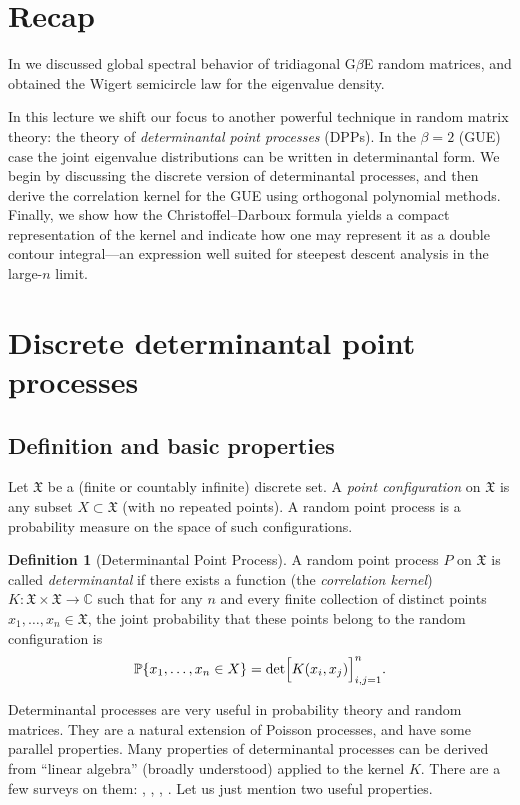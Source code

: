 \documentclass[letterpaper,11pt,oneside,reqno]{book}
\numberwithin{equation}{chapter}  %
\theoremstyle{definition}
\newtheorem{definition}[proposition]{Definition}
\begin{document}
\section{Recap}
In
we discussed global spectral behavior of
tridiagonal G$\beta$E random matrices,
and obtained the Wigert semicircle law for the eigenvalue density.

In this lecture we shift our focus to another powerful
technique in random matrix theory: the theory of
\emph{determinantal point processes} (DPPs). In the
$\beta=2$ (GUE) case the joint eigenvalue distributions can
be written in determinantal form. We begin by discussing the
discrete version of determinantal processes, and then derive
the correlation kernel for the GUE using orthogonal
polynomial methods. Finally, we show how the
Christoffel--Darboux formula yields a compact representation
of the kernel and indicate how one may represent it as a
double contour integral—an expression well suited for
steepest descent analysis in the large-$n$ limit.

\section{Discrete determinantal point processes}
\label{lecture5:sec:dpp-discrete}
\subsection{Definition and basic properties}

Let $\mathfrak{X}$ be a (finite or countably infinite)
discrete set. A \emph{point configuration} on $\mathfrak{X}$
is any subset $X\subset\mathfrak{X}$ (with no repeated
points). A random point process is a probability measure on
the space of such configurations.

\begin{definition}[Determinantal Point Process]
A random point process $P$ on $\mathfrak{X}$ is called
\emph{determinantal} if there exists a function (the
\emph{correlation kernel})
$K:\mathfrak{X}\times\mathfrak{X}\to\mathbb{C}$ such that
for any $n$ and every finite collection of distinct points
$x_1,\dots,x_n\in \mathfrak{X}$, the joint probability that
these points belong to the random configuration is
\[
\operatorname{\mathbb{P}}\{x_1,\dots,x_n\in X\}=\det\Bigl[K(x_i,x_j)\Bigr]_{i,j=1}^n.
\]
\end{definition}

Determinantal processes are very useful in probability theory and random matrices.
They are a natural extension of Poisson processes, and have some parallel properties.
Many properties of determinantal processes can be derived from ``linear algebra'' (broadly
understood) applied to the kernel $K$.
There are a few surveys on them:
\cite{Soshnikov2000}, \cite{peres2006determinantal},
\cite{Borodin2009},
\cite{kulesza2012determinantal}.
Let us just mention two useful properties.
\end{document}
